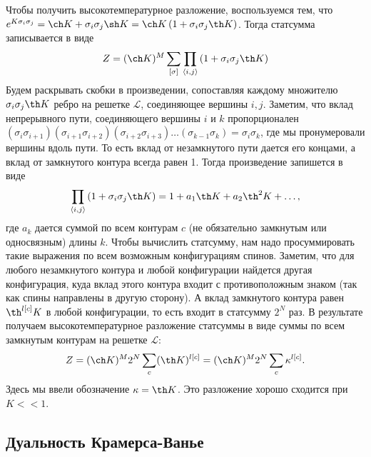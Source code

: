 \documentclass[a4paper,12pt]{article}
\theoremstyle{definition}
\theoremstyle{definition}
\theoremstyle{definition}
\begin{document}
Чтобы получить высокотемпературное разложение, воспользуемся тем, что $e^{K\sigma_i\sigma_j}=\ch K+\sigma_i\sigma_j\sh K=\ch K \left(1+\sigma_i\sigma_j \th K\right)$. Тогда статсумма записывается в виде
\begin{equation}
  \label{eq:80}
  Z=(\ch K)^M\sum_{[\sigma]}\prod_{\left<i,j\right>}\left(1+\sigma_i \sigma_j \th K\right)
\end{equation}
Будем раскрывать скобки в произведении, сопоставляя каждому множителю $\sigma_i\sigma_j \th K$ ребро на решетке $\mathcal{L}$, соединяющее вершины $i,j$. Заметим, что вклад непрерывного пути, соединяющего вершины $i$ и $k$ пропорционален $(\sigma_i \sigma_{i+1}) (\sigma_{i+1}\sigma_{i+2}) (\sigma_{i+2}\sigma_{i+3})\dots (\sigma_{k-1}\sigma_k)=\sigma_{i}\sigma_k$, где мы пронумеровали вершины вдоль пути. То есть вклад от незамкнутого пути дается его концами, а вклад от замкнутого контура всегда равен 1.  Тогда произведение запишется в виде
\begin{equation}
  \label{eq:107}
  \prod_{\left<i,j\right>}\left(1+\sigma_i \sigma_j \th K\right)=1+a_1 \th K +a_2 \th^2 K+\dots,
\end{equation}
где $a_k$ дается суммой по всем контурам $c$ (не обязательно замкнутым или односвязным) длины $k$.
Чтобы вычислить статсумму, нам надо просуммировать такие выражения по всем возможным конфигурациям спинов. Заметим, что для любого незамкнутого контура и любой конфигурации найдется другая конфигурация, куда вклад этого контура входит с противоположным знаком (так как спины направлены в другую сторону). А вклад замкнутого контура равен $\th^{l[c]}K$ в любой конфигурации, то есть входит в статсумму $2^N$ раз. В результате получаем высокотемпературное разложение статсуммы в виде суммы по всем замкнутым контурам на решетке $\mathcal{L}$:
\begin{equation}
  \label{eq:108}
  Z=(\ch K)^M 2^N \sum_c (\th K)^{l[c]}=(\ch K)^M 2^N \sum_c \kappa^{l[c]}.
\end{equation}
Здесь мы ввели обозначение $\kappa=\th K$. Это разложение хорошо сходится при $K<<1$.

\subsection{Дуальность Крамерса-Ванье}
\label{sec:duality}
\end{document}
